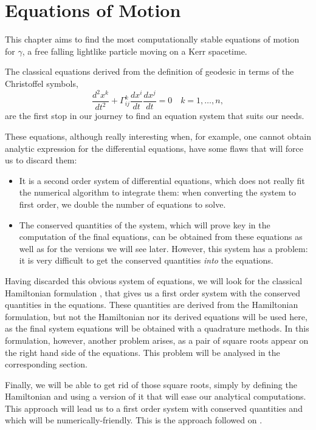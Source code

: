 \chapter{Equations of Motion}

This chapter aims to find the most computationally stable equations of motion for $\gamma$, a free falling lightlike particle moving on a Kerr spacetime.

The classical equations derived from the definition of geodesic in terms of the Christoffel symbols,
\[
	\frac{d^2x^k}{dt^2} + \Gamma^k_{ij} \frac{d x^i}{dt} \frac{d x^j}{dt} = 0 \quad k = 1, \dots, n,
\]
are the first stop in our journey to find an equation system that suits our needs.

These equations, although really interesting when, for example, one cannot obtain analytic expression for the differential equations, have some flaws that will force us to discard them:
\begin{itemize}
	\item It is a second order system of differential equations, which does not really fit the numerical algorithm to integrate them: when converting the system to first order, we double the number of equations to solve.
	\item The conserved quantities of the system, which will prove key in the computation of the final equations, can be obtained from these equations as well as for the versions we will see later. However, this system has a problem: it is very difficult to get the conserved quantities \emph{into} the equations.
\end{itemize}

Having discarded this obvious system of equations, we will look for the classical Hamiltonian formulation \cite[Sec. 33.5]{thorne73}, that gives us a first order system with the conserved quantities in the equations. These quantities are derived from the Hamiltonian formulation, but not the Hamiltonian nor its derived equations will be used here, as the final system equations will be obtained with a quadrature methods. In this formulation, however, another problem arises, as a pair of square roots appear on the right hand side of the equations. This problem will be analysed in the corresponding section.

Finally, we will be able to get rid of those square roots, simply by defining the Hamiltonian and using a version of it that will ease our analytical computations. This approach will lead us to a first order system with conserved quantities and which will be numerically-friendly. This is the approach followed on \cite{thorne15}.

